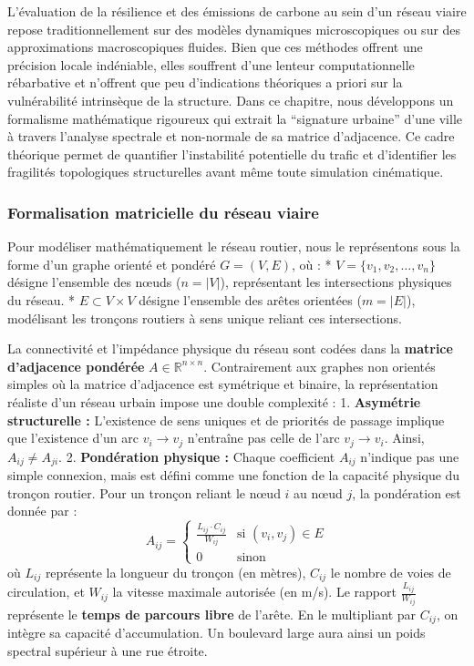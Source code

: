 \documentclass[10pt, a4paper]{article}
\begin{document}
L'évaluation de la résilience et des émissions de carbone au sein d'un
réseau viaire repose traditionnellement sur des modèles dynamiques
microscopiques ou sur des approximations macroscopiques fluides. Bien
que ces méthodes offrent une précision locale indéniable, elles
souffrent d'une lenteur computationnelle rébarbative et n'offrent que
peu d'indications théoriques a priori sur la vulnérabilité intrinsèque
de la structure. Dans ce chapitre, nous développons un formalisme
mathématique rigoureux qui extrait la ``signature urbaine'' d'une ville
à travers l'analyse spectrale et non-normale de sa matrice d'adjacence.
Ce cadre théorique permet de quantifier l'instabilité potentielle du
trafic et d'identifier les fragilités topologiques structurelles avant
même toute simulation cinématique.

\subsubsection{Formalisation matricielle du réseau
viaire}\label{formalisation-matricielle-du-ruxe9seau-viaire}

Pour modéliser mathématiquement le réseau routier, nous le représentons
sous la forme d'un graphe orienté et pondéré \(G = (V, E)\), où : *
\(V = \{v_1, v_2, \dots, v_n\}\) désigne l'ensemble des nœuds
(\(n = |V|\)), représentant les intersections physiques du réseau. *
\(E \subset V \times V\) désigne l'ensemble des arêtes orientées
(\(m = |E|\)), modélisant les tronçons routiers à sens unique reliant
ces intersections.

La connectivité et l'impédance physique du réseau sont codées dans la
\textbf{matrice d'adjacence pondérée} \(A \in \mathbb{R}^{n \times n}\).
Contrairement aux graphes non orientés simples où la matrice d'adjacence
est symétrique et binaire, la représentation réaliste d'un réseau urbain
impose une double complexité : 1. \textbf{Asymétrie structurelle :}
L'existence de sens uniques et de priorités de passage implique que
l'existence d'un arc \(v_i \to v_j\) n'entraîne pas celle de l'arc
\(v_j \to v_i\). Ainsi, \(A_{ij} \neq A_{ji}\). 2. \textbf{Pondération
physique :} Chaque coefficient \(A_{ij}\) n'indique pas une simple
connexion, mais est défini comme une fonction de la capacité physique du
tronçon routier. Pour un tronçon reliant le nœud \(i\) au nœud \(j\), la
pondération est donnée par :
\[A_{ij} = \begin{cases} \frac{L_{ij} \cdot C_{ij}}{W_{ij}} & \text{si } (v_i, v_j) \in E \\ 0 & \text{sinon} \end{cases}\]
où \(L_{ij}\) représente la longueur du tronçon (en mètres), \(C_{ij}\)
le nombre de voies de circulation, et \(W_{ij}\) la vitesse maximale
autorisée (en m/s). Le rapport \(\frac{L_{ij}}{W_{ij}}\) représente le
\textbf{temps de parcours libre} de l'arête. En le multipliant par
\(C_{ij}\), on intègre sa capacité d'accumulation. Un boulevard large
aura ainsi un poids spectral supérieur à une rue étroite.
\end{document}

